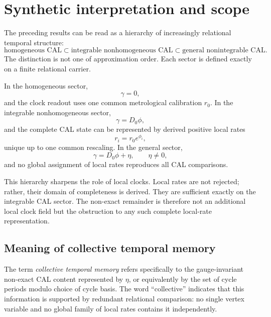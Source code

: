 
\section{Synthetic interpretation and scope}
\label{sec:discussion}

The preceding results can be read as a hierarchy of increasingly relational temporal structure:
\begin{equation}
\boxed{
\text{homogeneous CAL}
\subset
\text{integrable nonhomogeneous CAL}
\subset
\text{general nonintegrable CAL}.
}
\label{eq:temporal-hierarchy}
\end{equation}
The distinction is not one of approximation order. Each sector is defined exactly on a finite relational carrier.

In the homogeneous sector,
\begin{equation}
\gamma=0,
\end{equation}
and the clock readout uses one common metrological calibration $r_0$. In the integrable nonhomogeneous sector,
\begin{equation}
\gamma=D_0\phi,
\end{equation}
and the complete CAL state can be represented by derived positive local rates
\begin{equation}
r_i=r_0e^{\phi_i},
\end{equation}
unique up to one common rescaling. In the general sector,
\begin{equation}
\gamma=D_0\phi+\eta,
\qquad
\eta\neq0,
\end{equation}
and no global assignment of local rates reproduces all CAL comparisons.

This hierarchy sharpens the role of local clocks. Local rates are not rejected; rather, their domain of completeness is derived. They are sufficient exactly on the integrable CAL sector. The non-exact remainder is therefore not an additional local clock field but the obstruction to any such complete local-rate representation.

\subsection{Meaning of collective temporal memory}

The term \emph{collective temporal memory} refers specifically to the gauge-invariant non-exact CAL content represented by $\eta$, or equivalently by the set of cycle periods modulo choice of cycle basis. The word ``collective'' indicates that this information is supported by redundant relational comparison: no single vertex variable and no global family of local rates contains it independently.

